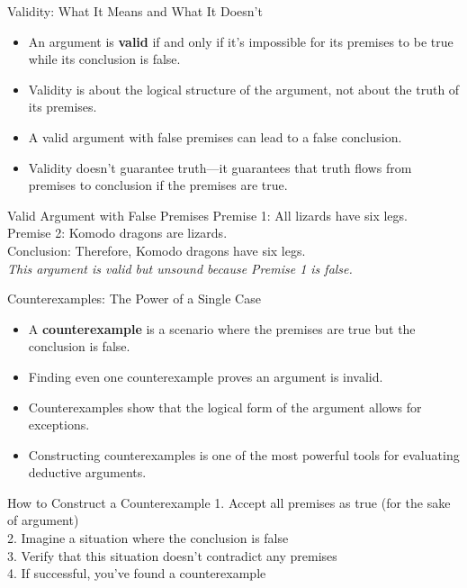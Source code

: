 \documentclass{beamer}
\begin{document}
\begin{frame}{Validity: What It Means and What It Doesn't}
    \begin{itemize}
        \item An argument is \textbf{valid} if and only if it's impossible for its premises to be true while its conclusion is false.
        \item Validity is about the logical structure of the argument, not about the truth of its premises.
        \item A valid argument with false premises can lead to a false conclusion.
        \item Validity doesn't guarantee truth—it guarantees that truth flows from premises to conclusion if the premises are true.
    \end{itemize}
    
    \begin{exampleblock}{Valid Argument with False Premises}
        Premise 1: All lizards have six legs.\\
        Premise 2: Komodo dragons are lizards.\\
        Conclusion: Therefore, Komodo dragons have six legs.\\
        
        \textit{This argument is valid but unsound because Premise 1 is false.}
    \end{exampleblock}
\end{frame}

\begin{frame}{Counterexamples: The Power of a Single Case}
    \begin{itemize}
        \item A \textbf{counterexample} is a scenario where the premises are true but the conclusion is false.
        \item Finding even one counterexample proves an argument is invalid.
        \item Counterexamples show that the logical form of the argument allows for exceptions.
        \item Constructing counterexamples is one of the most powerful tools for evaluating deductive arguments.
    \end{itemize}
    
    \begin{alertblock}{How to Construct a Counterexample}
        1. Accept all premises as true (for the sake of argument)\\
        2. Imagine a situation where the conclusion is false\\
        3. Verify that this situation doesn't contradict any premises\\
        4. If successful, you've found a counterexample
    \end{alertblock}
\end{frame}
\end{document}
